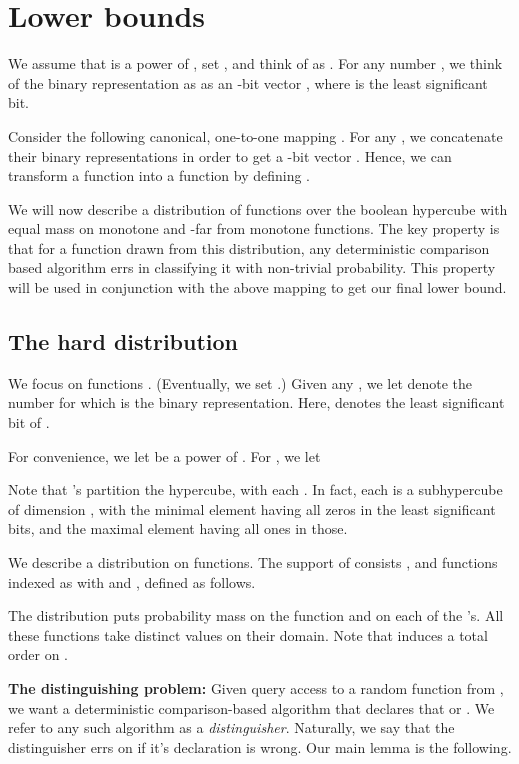 \documentclass[11pt]{article}
\begin{document}
\section{Lower bounds} \label{sec:dist}

\def\f{\widetilde{f}}
\def\v{{\tt val}}
We assume that  is a power of , set , and think of  as . 
For any number , we think of the binary representation as  as an -bit vector ,
where  is the least significant bit.

Consider the following canonical, one-to-one mapping .
For any , we concatenate their binary representations in order 
to get a -bit vector . Hence, we can transform a function 
into a function  by defining .


We will now describe a distribution of functions over the boolean hypercube with equal mass on monotone and -far from monotone functions. The key property is that for a function drawn from this distribution, any deterministic comparison based algorithm errs in classifying it with non-trivial probability. 
This property will be used in conjunction with the above mapping to get our final lower bound.


\subsection{The hard distribution} \label{sec:hard}

We focus on functions . (Eventually, we set .)
Given any , we let  denote the number for which  is the binary representation. Here,  denotes the least significant bit of . 

For convenience, we let  be a power of . For , we let  

Note that 's partition the hypercube, with each .
In fact, each  is a subhypercube of dimension , with the minimal element having all zeros in the  least significant bits, and the maximal element having all ones in those.

We describe a distribution  on functions. 
The support of  consists ,
and  functions indexed as  with  and , defined as follows.


The distribution  puts probability mass  on the function  and  on each of the 's. 
All these functions take distinct values on their domain.
Note that  induces a total order on .\smallskip

\noindent
\textbf{The distinguishing problem:} Given query access to a random function  from , we want a deterministic comparison-based algorithm
that declares that  or . We refer to any such algorithm as a \emph{distinguisher}. 
Naturally, we say that the distinguisher errs on  if it's declaration is wrong.
Our main lemma is the following.
\end{document}
